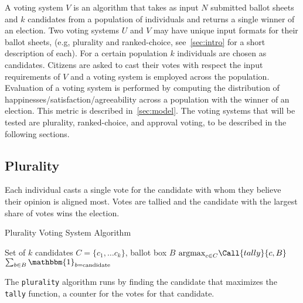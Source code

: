 \renewcommand{\algorithmicrequire}{\textbf{Input:}}
A voting system $V$ is an algorithm that takes as input $N$ submitted ballot sheets and $k$ 
candidates from a population of individuals and returns a single winner 
of an election.
Two voting systems $U$ and $V$ may have unique input formats for their ballot sheets, (e.g, plurality and ranked-choice, see~\ref{sec:intro}
for a short description of each).
For a certain population $k$ individuals are chosen as candidates. 
Citizens are asked to cast their votes with respect the input requirements of $V$ and a voting system is employed across the population. \newline
\indent Evaluation of a voting system is performed by computing the distribution of happinesses/satisfaction/agreeability across a population  
with the winner of an election.
This metric is described in~\ref{sec:model}.
\newline
\indent The voting systems that will be tested are plurality, ranked-choice, and approval voting, to be described in the following sections.
\subsection{Plurality}
Each individual casts a single vote for the candidate with whom they believe their opinion is aligned most.
Votes are tallied and the candidate with the largest share of votes wins the election.
\begin{algorithm}[H]
\caption{Plurality Voting System Algorithm}\label{alg:plurality}
\begin{algorithmic}
    \Require Set of $k$ candidates $C=\{c_1, \ldots c_k\}$, ballot box $B$
    \Return $\mathrm{argmax}_{c\in C} \Call{tally}{c, B}$
    \State \Return $\sum_{b \in B}\mathbbm{1}_{b = \mathrm{candidate}}$ 
    \EndFunction
\end{algorithmic}
\end{algorithm}
The \texttt{plurality} algorithm runs by finding the candidate that maximizes the \texttt{tally} function, a counter for the votes
for that candidate.
